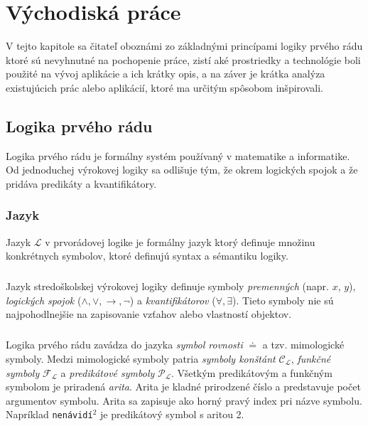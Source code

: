 \chapter{Východiská práce}
\label{kap:vychodiska} %

V tejto kapitole sa čitateľ oboznámi zo základnými princípami logiky prvého rádu ktoré sú nevyhnutné na pochopenie práce, zistí aké prostriedky a technológie boli použité na vývoj aplikácie a ich krátky opis, a na záver je krátka analýza existujúcich prác alebo aplikácií, ktoré ma určitým spôsobom inšpirovali.

\section{Logika prvého rádu}
Logika prvého rádu je formálny systém používaný v matematike a informatike. Od jednoduchej výrokovej logiky sa odlišuje tým, že okrem logických spojok a  že pridáva predikáty a kvantifikátory.



\subsection{Jazyk}
Jazyk $\mathcal{L}$ v prvorádovej logike je formálny jazyk ktorý definuje množinu konkrétnych symbolov, ktoré definujú syntax a sémantiku logiky.
\paragraph{}
Jazyk stredoškolskej výrokovej logiky definuje symboly \emph{premenných} (napr. $x$, $y$), \emph{logických spojok} ($\wedge, \vee, \to, \neg$) a \emph{kvantifikátorov} ($\forall, \exists$). Tieto symboly nie sú najpohodlnejšie na zapisovanie vzťahov alebo vlastností objektov. 
\paragraph{}
Logika prvého rádu zavádza do jazyka \emph{symbol rovnosti} $\doteq$ a tzv. mimologické symboly. Medzi mimologické symboly patria \emph{symboly konštánt} $\mathcal{C}_\mathcal{L}$, \emph{funkčné symboly} $\mathcal{F}_\mathcal{L}$ a \emph{predikátové symboly} $\mathcal{P}_\mathcal{L}$. Všetkým predikátovým a funkčným symbolom je priradená \emph{arita}. Arita je kladné prirodzené číslo a predstavuje počet argumentov symbolu. Arita sa zapisuje ako horný pravý index pri názve symbolu. Napríklad \texttt{nenávidí}$^2$ je predikátový symbol s aritou 2.

